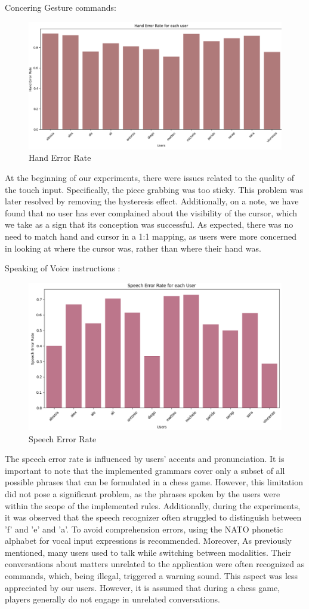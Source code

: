 \documentclass[a4paper, 11pt, twocolumn]{IEEEtran}
\begin{document}
    Concering Gesture commands:
    \begin{figure}
        \centering
        \includegraphics[width=.5\textwidth]{images/hand_error_rate.png}
        \caption{Hand Error Rate }
        \label{fig:hand_error_rate}
    \end{figure}
    At the beginning of our experiments, there were issues related to the quality of the touch input. Specifically, the piece grabbing was too sticky. This problem was later resolved by removing the hysteresis effect.
    Additionally, on a note, we have found that no user has ever complained about the visibility of the cursor, which we take as a sign that its conception was successful. 
    As expected, there was no need to match hand and cursor in a 1:1 mapping, as users were more concerned in looking at where the cursor was, rather than where their hand was.


    Speaking of Voice instructions : 
    \begin{figure}
        \centering
        \includegraphics[width=.5\textwidth]{images/speech_error_rate.png}
        \caption{Speech Error Rate }
        \label{fig:speech_error_rate}
    \end{figure}
    The speech error rate is influenced by users' accents and pronunciation. It is important to note that the implemented grammars cover only a subset of all possible phrases that can be formulated in a chess game. However, this limitation did not pose a significant problem, as the phrases spoken by the users were within the scope of the implemented rules. Additionally, during the experiments, it was observed that the speech recognizer often struggled to distinguish between 'f' and 'e' and 'a'. To avoid comprehension errors, using the NATO phonetic alphabet for vocal input expressions is recommended. Moreover, As previously mentioned, many users used to talk while switching between modalities. Their conversations about matters unrelated to the application were often recognized as commands, which, being illegal, triggered a warning sound. This aspect was less appreciated by our users. However, it is assumed that during a chess game, players generally do not engage in unrelated conversations.
    
\end{document}
